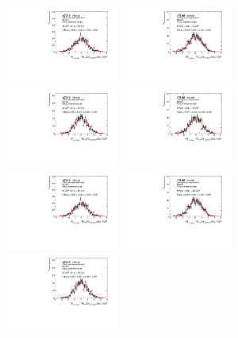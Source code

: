 \begin{figure}
\includegraphics[width=0.33\textwidth]{fig/UnfoldPull/SingleSlicePull32.pdf}
\includegraphics[width=0.33\textwidth]{fig/UnfoldPull/SingleSlicePull33.pdf}
\includegraphics[width=0.33\textwidth]{fig/UnfoldPull/SingleSlicePull35.pdf}
%
\includegraphics[width=0.33\textwidth]{fig/UnfoldPull/SingleSlicePull36.pdf}
\includegraphics[width=0.33\textwidth]{fig/UnfoldPull/SingleSlicePull37.pdf}
\includegraphics[width=0.33\textwidth]{fig/UnfoldPull/SingleSlicePull38.pdf}
%
\includegraphics[width=0.33\textwidth]{fig/UnfoldPull/SingleSlicePull39.pdf}

\end{figure}
